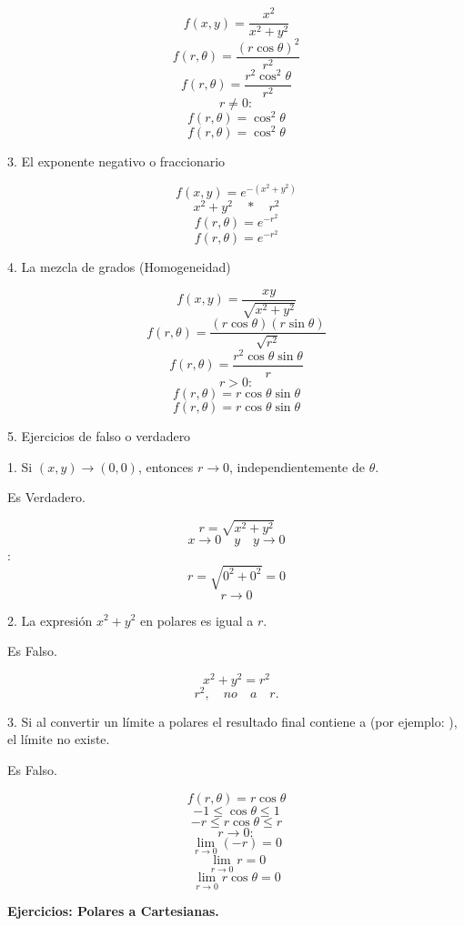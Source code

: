 \documentclass{article}
\begin{document}
\begin{justfy}
\[f(x,y)=\frac{x^2}{x^2+y^2}\]
\[f(r,\theta)=\frac{(r\cos\theta)^2}{r^2}\]
\[f(r,\theta)=\frac{r^2\cos^2\theta}{r^2}\]
\[r\neq 0:\]
\[f(r,\theta)=\cos^2\theta\]
\[\boxed{f(r,\theta)=\cos^2\theta}\]

\vspace{0.1cm}
\small {3. El exponente negativo o fraccionario}

\[f(x,y)=e^{-(x^2+y^2)}\]
\[x^2+y^2 \quad * \quad r^2\]
\[f(r,\theta)=e^{-r^2}\]
\[\boxed{f(r,\theta)=e^{-r^2}}\]

\vspace{0.1cm}
\small {4. La mezcla de grados (Homogeneidad)}

\[f(x,y)=\frac{xy}{\sqrt{x^2+y^2}}\]
\[f(r,\theta)=\frac{(r\cos\theta)(r\sin\theta)}{\sqrt{r^2}}\]
\[f(r,\theta)=\frac{r^2\cos\theta\sin\theta}{r}\]
\[r>0:\]
\[f(r,\theta)=r\cos\theta\sin\theta\]
\[\boxed{f(r,\theta)=r\cos\theta\sin\theta}\]

\vspace{0.1cm}
\small {5. Ejercicios de falso o verdadero}

\small {1. Si $(x,y)\to(0,0)$, entonces $r\to0$,
independientemente de $\theta$.}

\begin{center}
    \small {Es Verdadero.}
\end{center}

\vspace{0.1cm}
\[r=\sqrt{x^2+y^2}\]
\[x\to0 \quad y \quad y\to0\]:
\[r=\sqrt{0^2+0^2}=0\]
\[\boxed{r\to0}\]

\newpage

\small {2. La expresión $x^2+y^2$ en polares es igual a $r$.}

\begin{center}
    \small{Es Falso.}
\end{center}

\[\boxed{x^2+y^2=r^2}\]
\[r^2,\quad no \quad a \quad r.\]

\small {3. Si al convertir un límite a polares el resultado final contiene a  (por ejemplo: ), el límite no existe.}

\begin{center}
    \small {Es Falso.}
\end{center}

\[f(r,\theta)=r\cos\theta\]
\[-1\leq\cos\theta\leq1\]
\[-r\leq r\cos\theta\leq r\]
\[r\to0:\]
\[\lim_{r\to0}(-r)=0\]
\[\lim_{r\to0}r=0\]
\[\boxed{\lim_{r\to0}r\cos\theta=0}\]

\vspace{0.1cm}
\small \textbf{Ejercicios: Polares a Cartesianas.}


\end{justfy}
\end{document}
